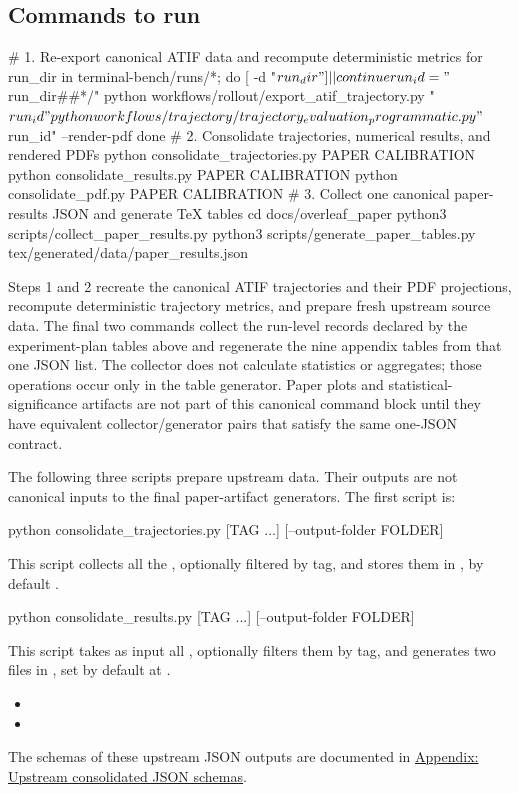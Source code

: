 \documentclass[11pt]{article}
\begin{document}
\subsection*{Commands to run}
\begin{DocCode}
# 1. Re-export canonical ATIF data and recompute deterministic metrics
for run_dir in terminal-bench/runs/*; do
  [ -d "$run_dir" ] || continue
  run_id="${run_dir##*/}"
  python workflows/rollout/export_atif_trajectory.py "$run_id"
  python workflows/trajectory/trajectory_evaluation_programmatic.py "$run_id" --render-pdf
done
# 2. Consolidate trajectories, numerical results, and rendered PDFs
python consolidate_trajectories.py PAPER CALIBRATION
python consolidate_results.py PAPER CALIBRATION
python consolidate_pdf.py PAPER CALIBRATION
# 3. Collect one canonical paper-results JSON and generate TeX tables
cd docs/overleaf_paper
python3 scripts/collect_paper_results.py
python3 scripts/generate_paper_tables.py tex/generated/data/paper_results.json
\end{DocCode}

Steps 1 and 2 recreate the canonical ATIF trajectories and their PDF projections, recompute deterministic trajectory metrics, and prepare fresh upstream source data. The final two commands collect the run-level records declared by the experiment-plan tables above and regenerate the nine appendix tables from that one JSON list. The collector does not calculate statistics or aggregates; those operations occur only in the table generator. Paper plots and statistical-significance artifacts are not part of this canonical command block until they have equivalent collector/generator pairs that satisfy the same one-JSON contract.

The following three scripts prepare upstream data. Their outputs are not canonical inputs to the final paper-artifact generators.
The first script is:
\begin{DocCode}
python consolidate_trajectories.py [TAG ...] [--output-folder FOLDER]
\end{DocCode}
This script collects all the , optionally filtered by tag, and stores them in , by default .

\begin{DocCode}
python consolidate_results.py [TAG ...] [--output-folder FOLDER]
\end{DocCode}
This script takes as input all \hyperref[sec:agentic-rollout-run-configurations]{}, optionally filters them by tag, and generates two files in , set by default at .
\begin{itemize}
  \item {}
  \item {}
\end{itemize}
The schemas of these upstream JSON outputs are documented in \hyperref[sec:experiment-plan-consolidated-json-schema-appendix]{Appendix: Upstream consolidated JSON schemas}.
\end{document}
